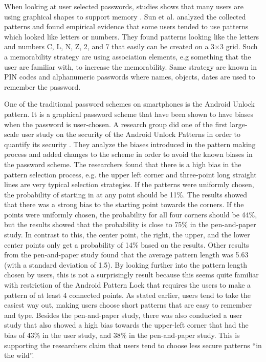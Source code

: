   When looking at user selected passwords, studies shows that many users are using graphical shapes to support memory \cite{Weiss}. Sun et al. \cite{Sun} analyzed the collected patterns and found empirical evidence that some users tended to use patterns which looked like letters or numbers. They found patterns looking like the letters and numbers C, L, N, Z, 2, and 7 that easily can be created on a 3$\times$3 grid. Such a memorability strategy are using association elements, e.g something that the user are familiar with, to increase the memorability. Same strategy are known in PIN codes and alphanumeric passwords where names, objects, dates are used to remember the password.

  One of the traditional password schemes on smartphones is the Android Unlock pattern. It is a graphical password scheme that have been shown to have biases when the password is user-chosen. A research group did one of the first large-scale user study on the security of the Android Unlock Patterns in order to quantify its security \cite{Uellenbeck}. They analyze the biases introduced in the pattern making process and added changes to the scheme in order to avoid the known biases in the password scheme. The researchers found that there is a high bias in the pattern selection process, e.g. the upper left corner and three-point long straight lines are very typical selection strategies. If the patterns were uniformly chosen, the probability of starting in at any point should be 11\%. The results showed that there was a strong bias to the starting point towards the corners. If the points were uniformly chosen, the probability for all four corners should be 44\%, but the results showed that the probability is close to 75\% in the pen-and-paper study. In contrast to this, the center point, the right, the upper, and the lower center points only get a probability of 14\% based on the results. Other results from the pen-and-paper study found that the average pattern length was 5.63 (with a standard deviation of 1.5). By looking further into the pattern length chosen by users, this is not a surprisingly result because this seems quite familiar with restriction of the Android Pattern Lock that requires the users to make a pattern of at least 4 connected points. As stated earlier, users tend to take the easiest way out, making users choose short patterns that are easy to remember and type. Besides the pen-and-paper study, there was also conducted a user study that also showed a high bias towards the upper-left corner that had the bias of 43\% in the user study, and 38\% in the pen-and-paper study. This is supporting the researchers claim that users tend to choose less secure patterns ``in the wild''.
